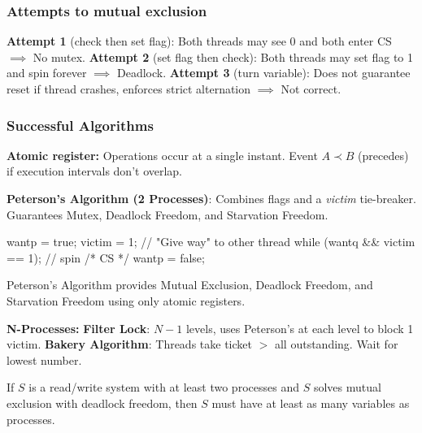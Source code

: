 \subsubsection{Attempts to mutual exclusion}

\begin{remark}
\textbf{Attempt 1} (check then set flag): Both threads may see 0 and both enter CS $\implies$ No mutex.
\textbf{Attempt 2} (set flag then check): Both threads may set flag to 1 and spin forever $\implies$ Deadlock.
\textbf{Attempt 3} (turn variable): Does not guarantee reset if thread crashes, enforces strict alternation $\implies$ Not correct.
\end{remark}

\subsubsection{Successful Algorithms}

\begin{definition}
    \textbf{Atomic register:} Operations occur at a single instant. Event $A \prec B$ (precedes) if execution intervals don't overlap.
\end{definition}

\textbf{Peterson's Algorithm (2 Processes)}:
Combines flags and a \textit{victim} tie-breaker. Guarantees Mutex, Deadlock Freedom, and Starvation Freedom.
\begin{codeexample}
wantp = true;
victim = 1; // "Give way" to other thread
while (wantq && victim == 1); // spin
/* CS */ wantp = false;
\end{codeexample}

\begin{theorem}
    Peterson's Algorithm provides Mutual Exclusion, Deadlock Freedom, and Starvation Freedom using only atomic registers.
\end{theorem}

\begin{remark}
    \textbf{N-Processes:}
    \textbf{Filter Lock}: $N-1$ levels, uses Peterson's at each level to block 1 victim.
    \textbf{Bakery Algorithm}: Threads take ticket $> $ all outstanding. Wait for lowest number.
\end{remark}

\begin{theorem}
    If $S$ is a read/write system with at least two processes and $S$ solves mutual exclusion with deadlock freedom, then $S$ must have at least as many variables as processes.
\end{theorem}

